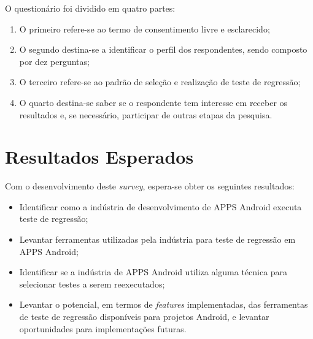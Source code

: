 O questionário foi dividido em quatro partes:

\begin{enumerate}
    \item O primeiro refere-se ao termo de consentimento livre e esclarecido;
    \item O segundo destina-se a identificar o perfil dos respondentes, sendo composto por dez perguntas;
    \item O terceiro refere-se ao padrão de seleção e realização de teste de regressão;
    \item O quarto destina-se saber se o respondente tem interesse em receber os resultados e, se necessário, participar de outras etapas da pesquisa.
\end{enumerate}


\section{Resultados Esperados}

Com o desenvolvimento deste \textit{survey}, espera-se obter os seguintes resultados:

\begin{itemize}
    \item Identificar como a indústria de desenvolvimento de \ac{APPS} Android executa teste de regressão;
    \item Levantar ferramentas utilizadas pela indústria para teste de regressão em \ac{APPS} Android;
    \item Identificar se a indústria de \ac{APPS} Android utiliza alguma técnica para selecionar testes a serem reexecutados;
    \item Levantar o potencial, em termos de \textit{features} implementadas, das ferramentas de teste de regressão disponíveis para projetos Android, e levantar oportunidades para implementações futuras.
\end{itemize}

